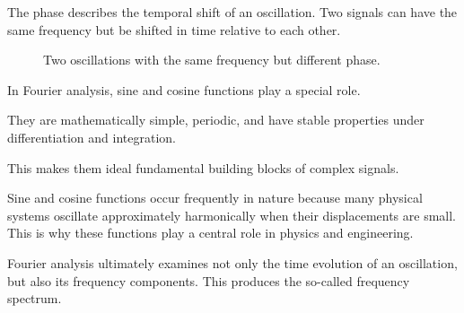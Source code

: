 
The phase describes the temporal shift of an oscillation.
Two signals can have the same frequency
but be shifted in time relative to each other.
\FloatBarrier
\begin{figure}[H]
	\centering
	\caption{Two oscillations with the same frequency but different phase.}
	\label{fig:phase}
\end{figure}

\begin{MathBox}
	\small
	\label{box:fourier-sinus-grundbaustein}
	In Fourier analysis, sine and cosine functions
	play a special role.
	
	They are mathematically simple,
	periodic,
	and have stable properties under differentiation and integration.
	
	This makes them ideal fundamental building blocks of complex signals.
\end{MathBox}

Sine and cosine functions occur frequently in nature
because many physical systems oscillate approximately harmonically
when their displacements are small.
This is why these functions play a central role in physics and engineering.

Fourier analysis ultimately examines not only the time evolution of an oscillation,
but also its frequency components.
This produces the so-called frequency spectrum.

